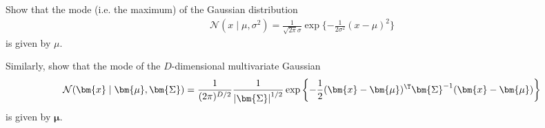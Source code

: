 \begin{question}{1.9}
	Show that the mode (i.e. the maximum) of the Gaussian distribution 
	\begin{align*}
		\mathcal{N}(x \mid \mu, \sigma^2) = \frac{1}{\sqrt{2\pi}\sigma} \exp\{ -\frac{1}{2\sigma^2} (x-\mu)^2 \} 
	\end{align*}
	is given by $\mu$. 
	
	Similarly, show that the mode of the $D$-dimensional multivariate Gaussian 
	\begin{align*}
		\mathcal{N}(\bm{x} \mid \bm{\mu}, \bm{\Sigma}) = \frac{1}{(2\pi)^{D/2}} \frac{1}{\left\lvert \bm{\Sigma} \right\rvert^{1/2}} \exp\left\{ -\frac{1}{2}(\bm{x}-\bm{\mu})^\T\bm{\Sigma}^{-1}(\bm{x}-\bm{\mu}) \right\}
	\end{align*} 
	is given by $\bm{\mu}$.
\end{question}

